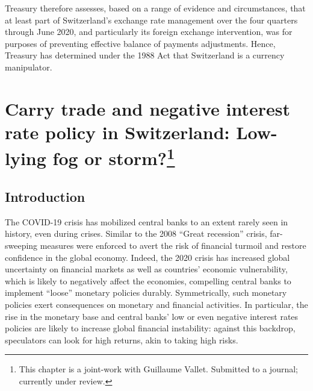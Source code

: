 \documentclass[a4paper, twoside]{templates/ociamthesis}
\begin{document}
\begin{savequote}
Treasury therefore assesses, based on a range of evidence and
circumstances, that at least part of Switzerland's exchange rate
management over the four quarters through June 2020, and particularly
its foreign exchange intervention, was for purposes of preventing
effective balance of payments adjustments. Hence, Treasury has
determined under the 1988 Act that Switzerland is a currency
manipulator.
\end{savequote}



\hypertarget{four}{%
\chapter[Carry trade and negative interest rate policy in Switzerland: Low-lying fog or storm?]{\texorpdfstring{Carry trade and negative interest rate policy in Switzerland: Low-lying fog or storm?\footnote{This chapter is a joint-work with Guillaume Vallet. Submitted to a journal; currently under review.}}{Carry trade and negative interest rate policy in Switzerland: Low-lying fog or storm?}}\label{four}}

\minitoc 

\hypertarget{fourone}{%
\section{Introduction}\label{fourone}}

\noindent The COVID-19 crisis has mobilized central banks to an extent rarely seen in history, even during crises. Similar to the 2008 ``Great recession'' crisis, far-sweeping measures were enforced to avert the risk of financial turmoil and restore confidence in the global economy. Indeed, the 2020 crisis has increased global uncertainty on financial markets as well as countries' economic vulnerability, which is likely to negatively affect the economies, compelling central banks to implement ``loose'' monetary policies durably. Symmetrically, such monetary policies exert consequences on monetary and financial activities. In particular, the rise in the monetary base and central banks' low or even negative interest rates policies are likely to increase global financial instability: against this backdrop, speculators can look for high returns, akin to taking high risks.
\end{document}
